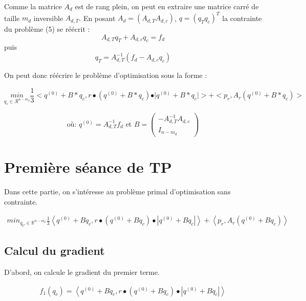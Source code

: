 Comme la matrice $A_d$ est de rang plein, on peut en extraire une matrice carré de taille $m_d$ inversible $A_{d,T}$. En posant  $A_d = (A_{d,T} A_{d,c})$, $q = (q_T q_c)^T$ la contrainte du problème (5) se réécrit : 
\begin{equation}
A_{d,T}q_T + A_{d,c}q_c = f_d
\end{equation}
puis 
\begin{equation}
q_T = A_{d,T}^{-1}(f_d - A_{d,c}q_c)
\end{equation}

On peut donc réécrire le problème d'optimisation sous la forme : 


\begin{equation}
\underset{q_c \in \mathcal{R}^{n - m_d}}{min} \frac{1}{3}<q^{(0)} + B*q_c, r \bullet(q^{(0)} + B*q_c)\bullet \vert q^{(0)} + B*q_c\vert > + <p_r, A_r(q^{(0)} + B*q_c)>
\end{equation}

$$\mbox{où: } q^{(0)} = A_{d,T}^{-1}f_d \mbox{ et } B = (\begin{array}{c} - A_{d,T}^{-1}A_{d,c} \\ I_{n-m_d} \end{array})$$


\section{Première séance de TP}

Dans cette partie, on s'intéresse au problème primal d'optimisation sans contrainte.

\vspace{-1.5em}
\begin{align}
  min_{q_C \in \mathbb{R}^{n-m_d}} \frac{1}{3} \left \langle q^{(0)} + B q_c, r \bullet (q^{(0)} + B q_c) \bullet |q^{(0)} + B q_c| \right \rangle + \left \langle p_r, A_r(q^{(0)} + B q_c) \right \rangle
\end{align}

\subsection{Calcul du gradient}

D'abord, on calcule le gradient du premier terme.

\vspace{-1.5em}
\begin{align}
  f_1 (q_c) = \left \langle q^{(0)} + B q_c, r \bullet (q^{(0)} + B q_c) \bullet |q^{(0)} + B q_c| \right \rangle
\end{align}

